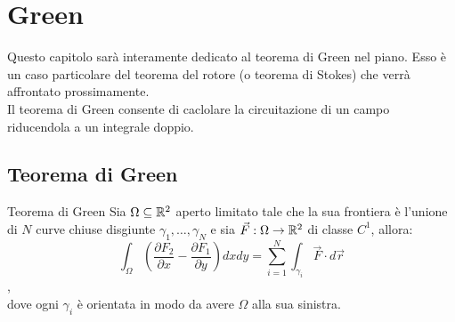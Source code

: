 \chapter{Green}
Questo capitolo sarà interamente dedicato al teorema di Green nel piano. Esso è un caso particolare del teorema del rotore (o teorema di Stokes) che verrà affrontato prossimamente.\\

Il teorema di Green consente di caclolare la circuitazione di un campo riducendola a un integrale doppio.

\section{Teorema di Green}
\begin{teorema}{Teorema di Green}
Sia $\Omega \subseteq \mathbb{R}^2$ aperto limitato tale che la sua frontiera è l'unione di $N$ curve chiuse disgiunte $\gamma_1, \dots, \gamma_N$  e sia $\vec F:\Omega\rightarrow \mathbb{R}^2$ di classe $C^1$, allora:
$$ \int_\Omega \left(\frac{\partial F_2}{\partial x}-\frac{\partial F_1}{\partial y}\right) dxdy = \sum_{i=1}^{N} \int_{\gamma_i} \vec{F} \cdot d\vec{r} $$,\\dove ogni $\gamma_i$ è orientata in modo da avere $\Omega$ alla sua sinistra.
\end{teorema}

